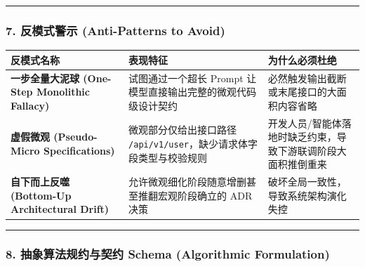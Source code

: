 \begin{center}\rule{0.5\linewidth}{0.5pt}\end{center}

\subsubsection{7. 反模式警示 (Anti-Patterns to
Avoid)}\label{ux53cdux6a21ux5f0fux8b66ux793a-anti-patterns-to-avoid-4}

{\def\LTcaptype{} %
\begin{longtable}[]{@{}
  >{\raggedright\arraybackslash}p{}
  >{\raggedright\arraybackslash}p{}
  >{\raggedright\arraybackslash}p{}@{}}
\toprule\noalign{}
\begin{minipage}[b]{\linewidth}\raggedright
反模式名称
\end{minipage} & \begin{minipage}[b]{\linewidth}\raggedright
表现特征
\end{minipage} & \begin{minipage}[b]{\linewidth}\raggedright
为什么必须杜绝
\end{minipage} \\
\midrule\noalign{}
\endhead
\bottomrule\noalign{}
\endlastfoot
\textbf{一步全量大泥球 (One-Step Monolithic Fallacy)} & 试图通过一个超长
Prompt 让模型直接输出完整的微观代码级设计契约 &
必然触发输出截断或末尾接口的大面积内容省略 \\
\textbf{虚假微观 (Pseudo-Micro Specifications)} & 微观部分仅给出接口路径
\texttt{/api/v1/user}，缺少请求体字段类型与校验规则 &
开发人员/智能体落地时缺乏约束，导致下游联调阶段大面积推倒重来 \\
\textbf{自下而上反噬 (Bottom-Up Architectural Drift)} &
允许微观细化阶段随意增删甚至推翻宏观阶段确立的 ADR 决策 &
破坏全局一致性，导致系统架构演化失控 \\
\end{longtable}
}

\begin{center}\rule{0.5\linewidth}{0.5pt}\end{center}

\subsubsection{8. 抽象算法规约与契约 Schema (Algorithmic
Formulation)}\label{ux62bdux8c61ux7b97ux6cd5ux89c4ux7ea6ux4e0eux5951ux7ea6-schema-algorithmic-formulation}

